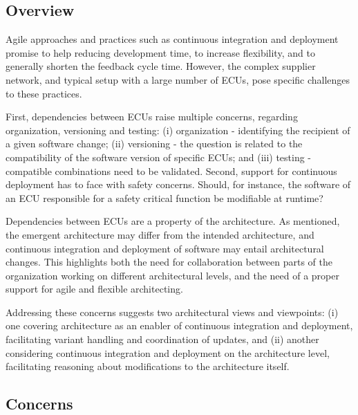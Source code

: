 \subsection{Overview}
Agile approaches and practices such as continuous integration and deployment promise to help reducing development time, to increase flexibility, and to generally shorten the feedback cycle time. However, 
the  complex supplier network,
and typical setup with a large number of ECUs,
pose specific challenges to %
these practices. %

First,  dependencies between ECUs raise multiple concerns,
regarding organization, versioning and testing:
(i)  organization -
identifying the recipient
of a given software change; (ii)
 versioning -
the question is related to the compatibility of the software version of specific ECUs; and
(iii)  testing -  %
compatible combinations need to be validated. 
Second, support for continuous deployment has to face with safety concerns.
Should, for instance, the software of an ECU responsible for a safety critical function
be modifiable at runtime?

Dependencies between ECUs are a property of the architecture.
As mentioned, the emergent architecture may differ from the intended architecture,
and continuous integration and deployment of software may entail architectural changes.
This highlights both the need for collaboration %
between parts of the organization working on different architectural levels, and the need of a proper support
for agile and flexible architecting.

Addressing these concerns suggests
two architectural views and viewpoints:
(i) one covering architecture as an enabler
of continuous integration and deployment,
facilitating variant handling and coordination of updates, and
%
(ii) another considering continuous integration and deployment
on the architecture level,
facilitating reasoning about modifications to the architecture itself.

\subsection{Concerns}

